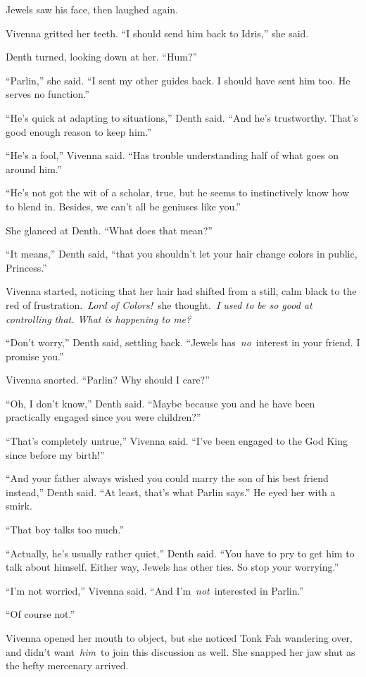 Jewels saw his face, then laughed again.

Vivenna gritted her teeth. “I should send him back to Idris,” she said.

Denth turned, looking down at her. “Hum?”

“Parlin,” she said. “I sent my other guides back. I should have sent him too. He serves no function.”

“He’s quick at adapting to situations,” Denth said. “And he’s trustworthy. That’s good enough reason to keep him.”

“He’s a fool,” Vivenna said. “Has trouble understanding half of what goes on around him.”

“He’s not got the wit of a scholar, true, but he seems to instinctively know how to blend in. Besides, we can’t all be geniuses like you.”

She glanced at Denth. “What does that mean?”

“It means,” Denth said, “that you shouldn’t let your hair change colors in public, Princess.”

Vivenna started, noticing that her hair had shifted from a still, calm black to the red of frustration.~\textit{Lord of Colors!}~she thought.~\textit{I used to be so good at controlling that. What is happening to me?}

“Don’t worry,” Denth said, settling back. “Jewels has~\textit{no}~interest in your friend. I promise you.”

Vivenna snorted. “Parlin? Why should I care?”

“Oh, I don’t know,” Denth said. “Maybe because you and he have been practically engaged since you were children?”

“That’s completely untrue,” Vivenna said. “I’ve been engaged to the God King since before my birth!”

“And your father always wished you could marry the son of his best friend instead,” Denth said. “At least, that’s what Parlin says.” He eyed her with a smirk.

“That boy talks too much.”

“Actually, he’s usually rather quiet,” Denth said. “You have to pry to get him to talk about himself. Either way, Jewels has other ties. So stop your worrying.”

“I’m not worried,” Vivenna said. “And I’m~\textit{not}~interested in Parlin.”

“Of course not.”

Vivenna opened her mouth to object, but she noticed Tonk Fah wandering over, and didn’t want~\textit{him}~to join this discussion as well. She snapped her jaw shut as the hefty mercenary arrived.


